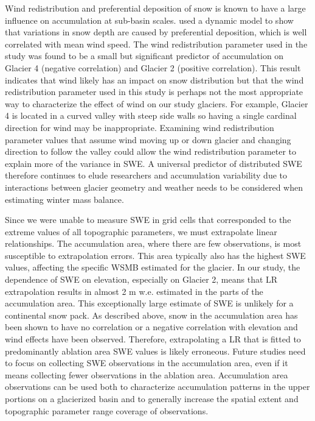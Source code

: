 \documentclass[twocolumn,letterpaper]{igs}
\begin{document}
Wind redistribution and preferential deposition of snow is known to have a large influence on accumulation at sub-basin scales. \cite{Dadic2010} used a dynamic model to show that variations in snow depth are caused by preferential deposition, which is well correlated with mean wind speed. The wind redistribution parameter used in the study was found to be a small but significant predictor of accumulation on Glacier 4 (negative correlation) and Glacier 2 (positive correlation). This result indicates that wind likely has an impact on snow distribution but that the wind redistribution parameter used in this study is perhaps not the most appropriate way to characterize the effect of wind on our study glaciers. For example, Glacier 4 is located in a curved valley with steep side walls so having a single cardinal direction for wind may be inappropriate. Examining wind redistribution parameter values that assume wind moving up or down glacier and changing direction to follow the valley could allow the wind redistribution parameter to explain more of the variance in SWE.  A universal predictor of distributed SWE therefore continues to elude researchers and accumulation variability due to interactions between glacier geometry and weather needs to be considered when estimating winter mass balance. 

Since we were unable to measure SWE in grid cells that corresponded to the extreme values of all topographic parameters, we must extrapolate linear relationships. The accumulation area, where there are few observations, is most susceptible to extrapolation errors. This area typically also has the highest SWE values, affecting the specific WSMB estimated for the glacier. In our study, the dependence of SWE on elevation, especially on Glacier 2, means that LR extrapolation results in almost 2 m w.e. estimated in the parts of the accumulation area. This exceptionally large estimate of SWE is unlikely for a continental snow pack. As described above, snow in the accumulation area has been shown to have no correlation or a negative correlation with elevation and wind effects have been observed. Therefore, extrapolating a LR that is fitted to predominantly ablation area SWE values is likely erroneous. Future studies need to focus on collecting SWE observations in the accumulation area, even if it means collecting fewer observations in the ablation area. Accumulation area observations can be used both to characterize accumulation patterns in the upper portions on a glacierized basin and to generally increase the spatial extent and topographic parameter range coverage of observations.
\end{document}
